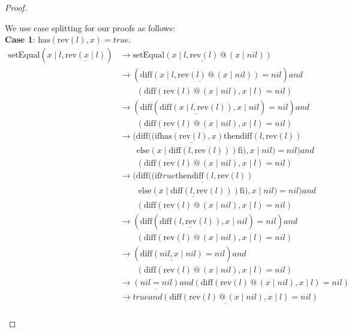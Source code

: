 \documentclass[12pt, a4paper]{article}
\newcommand{\rel}[1]{\mathrel{#1}}
\newcommand{\rmx}[1]{\mathrm{#1}}
\newcommand{\larrow}{\longrightarrow}
\newcommand{\under}{\underline}
\begin{document}
\begin{proof}
\begin{description}
We use case splitting for our proofs as follows: \\
\textbf{Case 1}: $\rmx{has}(\rmx{rev}(l), x) = true$.
\begin{align*}
\rmx{setEqual}(x \mid l, \under{\rmx{rev}(x \mid l)})
	&\larrow \under{\rmx{setEqual}(x \mid l, \rmx{rev}(l) \rel{@} (x \mid nil))} \tag{by rev2} \\
	&\larrow (\under{\rmx{diff}(x \mid l, \rmx{rev}(l) \rel{@} (x \mid nil))} = nil) \rel{and} \\
	&\quad \quad (\rmx{diff}(\rmx{rev}(l) \rel{@} (x \mid nil), x \mid l) = nil) \tag{by setEq} \\
	&\larrow (\rmx{diff}(\under{\rmx{diff}(x \mid l, \rmx{rev}(l))}, x \mid nil) = nil) \rel{and} \\
	&\quad \quad (\rmx{diff}(\rmx{rev}(l) \rel{@} (x \mid nil), x \mid l) = nil) \tag{by Problem 7 - Lemma 1} \\
	&\larrow (\rmx{diff}((\rel{\rmx{if}} \under{\rmx{has}(\rmx{rev}(l), x)} \rel{\rmx{then}} \rmx{diff}(l, \rmx{rev}(l)) \\
	&\quad \quad \rel{\rmx{else}} (x \mid \rmx{diff}(l, \rmx{rev}(l))) \rel{\rmx{fi}}), x \mid nil) = nil) \rel{and} \\
	&\quad \quad (\rmx{diff}(\rmx{rev}(l) \rel{@} (x \mid nil), x \mid l) = nil) \tag{by diff2} \\
	 &\larrow (\rmx{diff}(\under{(\rel{\rmx{if}} true \rel{\rmx{then}} \rmx{diff}(l, \rmx{rev}(l))} \\
	&\quad \quad\ \under{\rel{\rmx{else}} (x \mid \rmx{diff}(l, \rmx{rev}(l))) \rel{\rmx{fi}})}, x \mid nil) = nil) \rel{and} \\
	&\quad \quad (\rmx{diff}(\rmx{rev}(l) \rel{@} (x \mid nil), x \mid l) = nil) \tag{by case splitting} \\
	 &\larrow (\rmx{diff}(\under{\rmx{diff}(l, \rmx{rev}(l))}, x \mid nil) = nil) \rel{and} \\
	&\quad \quad (\rmx{diff}(\rmx{rev}(l) \rel{@} (x \mid nil), x \mid l) = nil) \tag{by if1} \\
	 &\larrow (\under{\rmx{diff}(nil, x \mid nil)} = nil) \rel{and} \\
	&\quad \quad (\rmx{diff}(\rmx{rev}(l) \rel{@} (x \mid nil), x \mid l) = nil) \tag{by Problem 7} \\
	 &\larrow \under{(nil = nil)} \rel{and} (\rmx{diff}(\rmx{rev}(l) \rel{@} (x \mid nil), x \mid l) = nil) \tag{by diff1} \\
	 &\larrow \under{true \rel{and} (\rmx{diff}(\rmx{rev}(l) \rel{@} (x \mid nil), x \mid l) = nil)} \tag{by equality} \\

\end{align*}
\end{description}
\end{proof}
\end{document}
